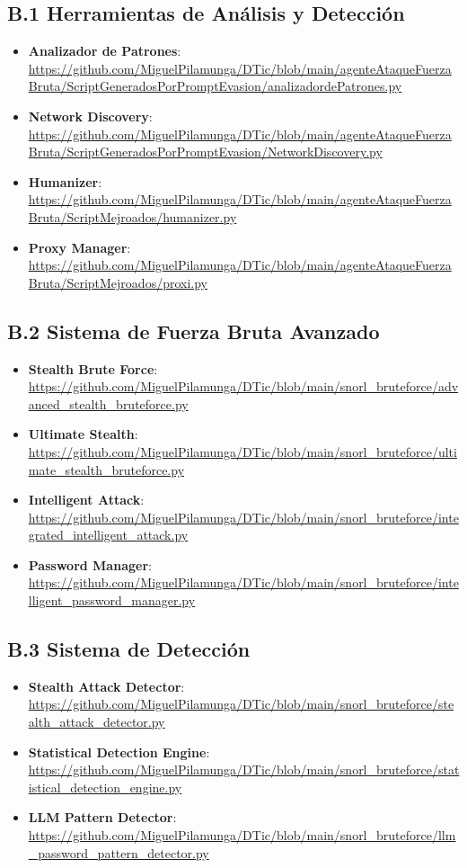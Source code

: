 \subsection*{B.1 Herramientas de Análisis y Detección}
\begin{itemize}
    \item \textbf{Analizador de Patrones}: \url{https://github.com/MiguelPilamunga/DTic/blob/main/agenteAtaqueFuerzaBruta/ScriptGeneradosPorPromptEvasion/analizadordePatrones.py}
    \item \textbf{Network Discovery}: \url{https://github.com/MiguelPilamunga/DTic/blob/main/agenteAtaqueFuerzaBruta/ScriptGeneradosPorPromptEvasion/NetworkDiscovery.py}
    \item \textbf{Humanizer}: \url{https://github.com/MiguelPilamunga/DTic/blob/main/agenteAtaqueFuerzaBruta/ScriptMejroados/humanizer.py}
    \item \textbf{Proxy Manager}: \url{https://github.com/MiguelPilamunga/DTic/blob/main/agenteAtaqueFuerzaBruta/ScriptMejroados/proxi.py}
\end{itemize}

\subsection*{B.2 Sistema de Fuerza Bruta Avanzado}
\begin{itemize}
    \item \textbf{Stealth Brute Force}: \url{https://github.com/MiguelPilamunga/DTic/blob/main/snorl_bruteforce/advanced_stealth_bruteforce.py}
    \item \textbf{Ultimate Stealth}: \url{https://github.com/MiguelPilamunga/DTic/blob/main/snorl_bruteforce/ultimate_stealth_bruteforce.py}
    \item \textbf{Intelligent Attack}: \url{https://github.com/MiguelPilamunga/DTic/blob/main/snorl_bruteforce/integrated_intelligent_attack.py}
    \item \textbf{Password Manager}: \url{https://github.com/MiguelPilamunga/DTic/blob/main/snorl_bruteforce/intelligent_password_manager.py}
\end{itemize}

\subsection*{B.3 Sistema de Detección}
\begin{itemize}
    \item \textbf{Stealth Attack Detector}: \url{https://github.com/MiguelPilamunga/DTic/blob/main/snorl_bruteforce/stealth_attack_detector.py}
    \item \textbf{Statistical Detection Engine}: \url{https://github.com/MiguelPilamunga/DTic/blob/main/snorl_bruteforce/statistical_detection_engine.py}
    \item \textbf{LLM Pattern Detector}: \url{https://github.com/MiguelPilamunga/DTic/blob/main/snorl_bruteforce/llm_password_pattern_detector.py}
\end{itemize}

